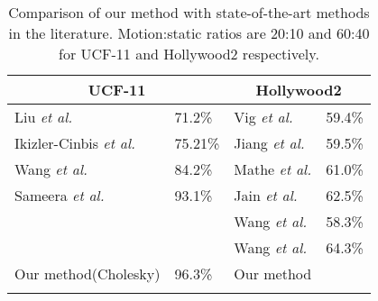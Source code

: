 \begin{table}[]
\centering
\label{my-label}
\begin{tabular}{|l|l||l|l|}
\hline
\multicolumn{2}{|c||}{UCF-11}    & \multicolumn{2}{c|}{Hollywood2} \\ \hline
Liu \textit{et al.}\cite{liu2009recognizing}            & 71.2\%  & Vig \textit{et al.}\cite{vig2012space}           & 59.4\%      \\ 
Ikizler-Cinbis \textit{et al.}\cite{ikizler2010object} & 75.21\% & Jiang \textit{et al.}\cite{jiang2012trajectory}      & 59.5\%      \\ 
Wang \textit{et al.}\cite{wang2011action}    & 84.2\%  & Mathe \textit{et al.}\cite{mathe2012dynamic}         & 61.0\%      \\ 
Sameera \textit{et al.}\cite{7486474}         & 93.1\%        & Jain \textit{et al.}\cite{jain2013better}           & 62.5\%      \\
                      &         & Wang \textit{et al.}\cite{wang2011action}             & 58.3\%      \\
                      &         & Wang \textit{et al.}\cite{wang2013action}          & 64.3\%      \\ \hline \hline
Our method(Cholesky)  & 96.3\%       & Our method        &             \\ \hline
\label{tbl:comparison}
\end{tabular}
\caption{Comparison of our method with state-of-the-art methods in the literature. Motion:static ratios are 20:10 and 60:40 for 
UCF-11 and Hollywood2 respectively.}
\end{table}



